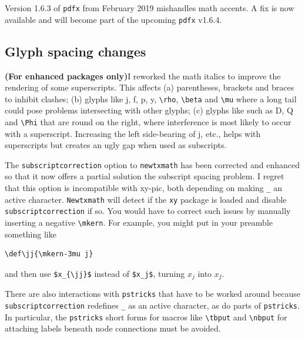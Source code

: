 \documentclass[\fsc]{article}
\theoremstyle{oldplain}
\theoremstyle{plain}
\begin{document}
Version 1.6.3 of {\tt pdfx} from February 2019  mishandles math accents. A fix is now available and will become part of the upcoming {\tt pdfx} v1.6.4.

\subsection{Glyph spacing changes} \textbf{(For enhanced packages only)}I reworked the math italics to improve the rendering of some  superscripts. This affects (a)  parentheses, brackets and braces to inhibit clashes; (b) glyphs like j, f, p, y, \verb|\rho|,  \verb|\beta| and  \verb|\mu| where a long tail could pose problems intersecting with other glyphs; (c) glyphs like such as D, Q and \verb|\Phi| that are round on the right, where interference is most likely to occur with a superscript. Increasing the left side-bearing of j, etc., helps with superscripts but creates an ugly gap when used as subscripts.  


 The {\tt subscriptcorrection} option to {\tt newtxmath} has been corrected and enhanced  so that it now offers a partial solution the subscript spacing problem. I regret that this option is incompatible with xy-pic, both depending on making \verb|_| an active character. {\tt Newtxmath}  will detect if the {\tt xy} package is loaded and disable {\tt subscriptcorrection} if so. You would have to correct such issues by manually inserting a negative \verb|\mkern|. For example, you might put in your preamble something like
 \begin{verbatim}
\def\jj{\mkern-3mu j}
\end{verbatim}
and then use \verb|$x_{\jj}$| instead of \verb|$x_j$|, turning $x_j$ into $x_{\jj}$.

There are also interactions with {\tt pstricks} that have to be worked around because {\tt subscriptcorrection} redefines \verb|_| as an active character, as do parts of {\tt pstricks}. In particular, the {\tt pstricks} short forms for macros like \verb|\tbput| and \verb|\nbput| for attaching labels beneath node connections must be avoided.
\end{document}
